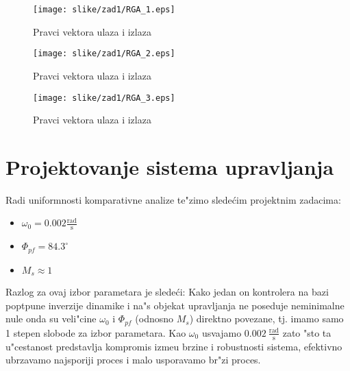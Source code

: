 \documentclass[a4paper,11pt]{article}
\theoremstyle{definition} \newtheorem{deff}{Definicija}[section]
\theoremstyle{definition} \newtheorem{prim}[deff]{Primer}
\theoremstyle{plain} \newtheorem{teor}[deff]{Teorema}
\begin{document}
	\begin{figure}[!ht]
		\centering
		\texttt{[image: slike/zad1/RGA\_1.eps]}
		\caption{Pravci vektora ulaza i izlaza}
		\label{fig:direkc_1}
	\end{figure}
	
	
	
	
	\begin{figure}[!ht]
		\centering
		\texttt{[image: slike/zad1/RGA\_2.eps]}
		\caption{Pravci vektora ulaza i izlaza}
		\label{fig:direkc_2}
	\end{figure}
	
	
	\begin{figure}[!ht]
		\centering
		\texttt{[image: slike/zad1/RGA\_3.eps]}
		\caption{Pravci vektora ulaza i izlaza}
		\label{fig:direkc_3}
	\end{figure}
	
	
	\clearpage
	
	\section{Projektovanje sistema upravljanja}
	
	Radi uniformnosti komparativne analize te"zimo slede\'cim projektnim zadacima: 
	\begin{adjustwidth}{2em}{2em}
		\begin{itemize}
			\item $\omega_0 = 0.002 \frac{\text{rad}}{\text{s}}$ 
			\item $\Phi_{pf} = 84.3^{\circ}$
			\item $M_s \approx 1 $
		\end{itemize}
	\end{adjustwidth}
	\noindent Razlog za ovaj izbor parametara je slede\'ci: Kako jedan on kontrolera na bazi poptpune inverzije dinamike i na"s objekat upravljanja ne poseduje neminimalne nule onda su veli"cine $\omega_0$ i $\Phi_{pf}$ (odnosno  $M_s$) direktno povezane, tj. imamo samo 1 stepen slobode za izbor parametara. Kao $\omega_0$ usvajamo $0.002~ \frac{\text{rad}}{\text{s}}$ zato "sto ta u"cestanost predstavlja kompromis izme\dj{}u brzine i robustnosti sistema, efektivno ubrzavamo najsporiji proces i malo usporavamo br"zi proces.\\
	
\end{document}
